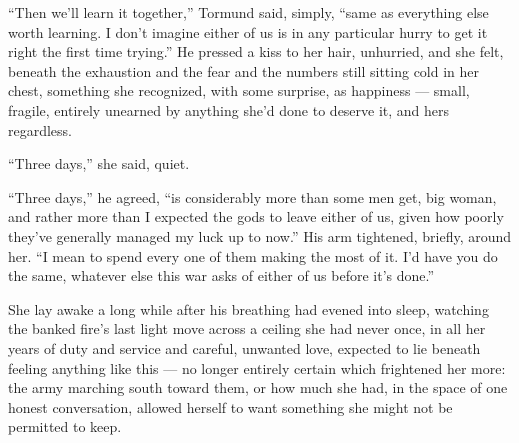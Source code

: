 “Then we’ll learn it together,” Tormund said, simply, “same as everything else worth learning. I don’t imagine either of us is in any particular hurry to get it right the first time trying.” He pressed a kiss to her hair, unhurried, and she felt, beneath the exhaustion and the fear and the numbers still sitting cold in her chest, something she recognized, with some surprise, as happiness — small, fragile, entirely unearned by anything she’d done to deserve it, and hers regardless.

“Three days,” she said, quiet.

“Three days,” he agreed, “is considerably more than some men get, big woman, and rather more than I expected the gods to leave either of us, given how poorly they’ve generally managed my luck up to now.” His arm tightened, briefly, around her. “I mean to spend every one of them making the most of it. I’d have you do the same, whatever else this war asks of either of us before it’s done.”

She lay awake a long while after his breathing had evened into sleep, watching the banked fire’s last light move across a ceiling she had never once, in all her years of duty and service and careful, unwanted love, expected to lie beneath feeling anything like this — no longer entirely certain which frightened her more: the army marching south toward them, or how much she had, in the space of one honest conversation, allowed herself to want something she might not be permitted to keep.